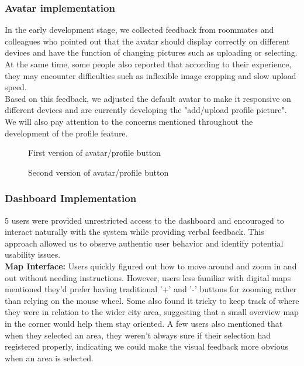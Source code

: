 \documentclass{report}
\begin{document}
\subsubsection{Avatar implementation}
In the early development stage, we collected feedback from roommates and colleagues who pointed out that the avatar should display correctly on different devices and have the function of changing pictures such as uploading or selecting.
At the same time, some people also reported that according to their experience, they may encounter difficulties such as inflexible image cropping and slow upload speed.\\
Based on this feedback, we adjusted the default avatar to make it responsive on different devices and are currently developing the "add/upload profile picture". We will also pay attention to the concerns mentioned throughout the development of the profile feature.
\begin{figure}
    \centering
    \caption{First version of avatar/profile button}
    \label{fig:plot14}
    \caption{Second version of avatar/profile button}
    \label{fig:plot15}
\end{figure}

\subsubsection{Dashboard Implementation}
5 users were provided unrestricted access to the dashboard and encouraged to interact naturally with the system while providing verbal feedback. This approach allowed us to observe authentic user behavior and identify potential usability issues.\\

\textbf{Map Interface: }
Users quickly figured out how to move around and zoom in and out without needing instructions. However, users less familiar with digital maps mentioned they'd prefer having traditional '+' and '-' buttons for zooming rather than relying on the mouse wheel. Some also found it tricky to keep track of where they were in relation to the wider city area, suggesting that a small overview map in the corner would help them stay oriented. A few users also mentioned that when they selected an area, they weren't always sure if their selection had registered properly, indicating we could make the visual feedback more obvious when an area is selected.\\
\end{document}
